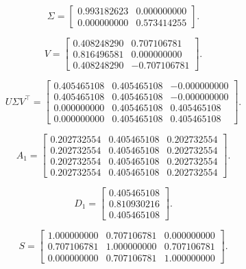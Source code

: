 \documentclass[11pt]{article}
\begin{document}
\noindent\begin{minipage}[t]{.48\textwidth}\footnotesize\setlength{\arraycolsep}{3pt}\[ \Sigma=\begin{bmatrix}0.993182623 & 0.000000000\\0.000000000 & 0.573414255\end{bmatrix}. \]
\end{minipage}\hfill\begin{minipage}[t]{.48\textwidth}\footnotesize\setlength{\arraycolsep}{3pt}\[ V=\begin{bmatrix}0.408248290 & 0.707106781\\0.816496581 & 0.000000000\\0.408248290 & -0.707106781\end{bmatrix}. \]
\end{minipage}\par
\noindent\begin{minipage}[t]{.48\textwidth}\footnotesize\setlength{\arraycolsep}{3pt}\[ U\Sigma V^\top=\begin{bmatrix}0.405465108 & 0.405465108 & -0.000000000\\0.405465108 & 0.405465108 & -0.000000000\\0.000000000 & 0.405465108 & 0.405465108\\0.000000000 & 0.405465108 & 0.405465108\end{bmatrix}. \]
\end{minipage}\hfill\begin{minipage}[t]{.48\textwidth}\footnotesize\setlength{\arraycolsep}{3pt}\[ A_1=\begin{bmatrix}0.202732554 & 0.405465108 & 0.202732554\\0.202732554 & 0.405465108 & 0.202732554\\0.202732554 & 0.405465108 & 0.202732554\\0.202732554 & 0.405465108 & 0.202732554\end{bmatrix}. \]
\end{minipage}\par
\noindent\begin{minipage}[t]{.48\textwidth}\footnotesize\setlength{\arraycolsep}{3pt}\[ D_1=\begin{bmatrix}0.405465108\\0.810930216\\0.405465108\end{bmatrix}. \]
\end{minipage}\hfill\begin{minipage}[t]{.48\textwidth}\footnotesize\setlength{\arraycolsep}{3pt}\[ S=\begin{bmatrix}1.000000000 & 0.707106781 & 0.000000000\\0.707106781 & 1.000000000 & 0.707106781\\0.000000000 & 0.707106781 & 1.000000000\end{bmatrix}. \]
\end{minipage}\par
\end{document}
